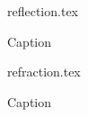 \documentclass[a4paper,11pt]{article} %
\begin{document}
\begin{figure}
\centering
{reflection.tex}
\caption{Caption}
\label{fig:my_label}
\end{figure}

\begin{figure}
\centering
{refraction.tex}
\caption{Caption}
\label{fig:my_label}
\end{figure}
\end{document}
